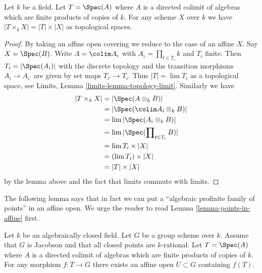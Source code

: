 \begin{lemma}
\label{lemma-profinite-product-over-field}
Let $k$ be a field. Let $T = \Spec(A)$ where $A$ is a directed colimit of
algebras which are finite products of copies of $k$. For any scheme $X$
over $k$ we have $|T \times_k X| = |T| \times |X|$ as topological spaces.
\end{lemma}

\begin{proof}
By taking an affine open covering we reduce to the case of an affine $X$.
Say $X = \Spec(B)$.
Write $A = \colim A_i$ with $A_i = \prod_{t \in T_i} k$ and $T_i$ finite.
Then $T_i = |\Spec(A_i)|$ with the discrete topology and the transition
morphisms $A_i \to A_{i'}$ are given by set maps $T_{i'} \to T_i$. Thus
$|T| = \lim T_i$ as a topological space, see
Limits, Lemma \ref{limits-lemma-topology-limit}. Similarly we have
\begin{align*}
|T \times_k X| & =
|\Spec(A \otimes_k B)| \\
& =
|\Spec(\colim A_i \otimes_k B)| \\
& =
\lim |\Spec(A_i \otimes_k B)| \\
& =
\lim |\Spec(\prod\nolimits_{t \in T_i} B)| \\
& =
\lim T_i \times |X| \\
& =
(\lim T_i) \times |X| \\
& =
|T| \times |X|
\end{align*}
by the lemma above and the fact that limits commute with limits.
\end{proof}

\noindent
The following lemma says that in fact we can put a
``algebraic profinite family of points'' in an affine open.
We urge the reader to read Lemma \ref{lemma-points-in-affine} first.

\begin{lemma}
\label{lemma-compact-set-in-affine}
Let $k$ be an algebraically closed field. Let $G$ be a group scheme over $k$.
Assume that $G$ is Jacobson and that all closed points are $k$-rational.
Let $T = \Spec(A)$ where $A$ is a directed colimit of algebras which
are finite products of copies of $k$. For any morphism $f : T \to G$
there exists an affine open $U \subset G$ containing $f(T)$.
\end{lemma}

